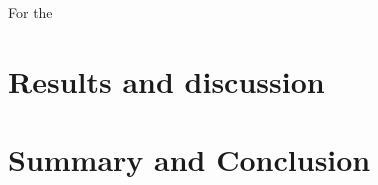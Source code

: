 \documentclass[twoside,twocolumn]{article}
\begin{document}
For the 

\section{Results and discussion}


\section{Summary and Conclusion}

{}

\end{document}
